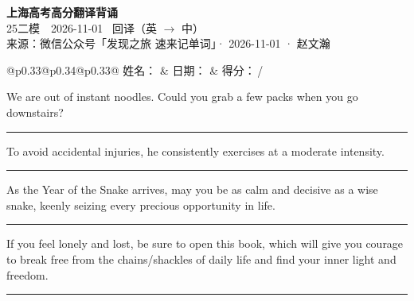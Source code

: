 \documentclass[11pt,a4paper]{article}
\newcommand{\num}[1]{\makebox[1.9em][r]{#1.}\hspace{0.3em}}
\newcommand{\wline}{\noindent\rule{\linewidth}{0.4pt}}
\begin{document}
\pagestyle{plain}
\begin{center}
{\LARGE\bfseries 上海高考高分翻译背诵 }\\[0.25em]
{\large 25二模　2026-11-01 \quad\ 回译（英 $\to$ 中）}\\[0.35em]
{\footnotesize 来源：微信公众号「发现之旅 速来记单词」· 2026-11-01 · 赵文瀚}
\end{center}

\vspace{0.4em}
\noindent\begin{tabular}{@{}p{0.33\textwidth}@{}p{0.34\textwidth}@{}p{0.33\textwidth}@{}}
姓名：\underline{\hspace{2.0cm}} & 日期：\underline{\hspace{2.0cm}} & 得分：\underline{\hspace{1.4cm}}\,/ \\
\end{tabular}

\vspace{0.5em}

\vspace{0.8em}
\num{1}We are out of instant noodles. Could you grab a few packs when you go downstairs?

\vspace{0.25em}

\wline

\num{2}To avoid accidental injuries, he consistently exercises at a moderate intensity.

\vspace{0.25em}

\wline

\num{3}As the Year of the Snake arrives, may you be as calm and decisive as a wise snake, keenly seizing every precious opportunity in life.

\vspace{0.25em}

\wline

\num{4}If you feel lonely and lost, be sure to open this book, which will give you courage to break free from the chains/shackles of daily life and find your inner light and freedom.

\vspace{0.25em}

\wline
\end{document}
